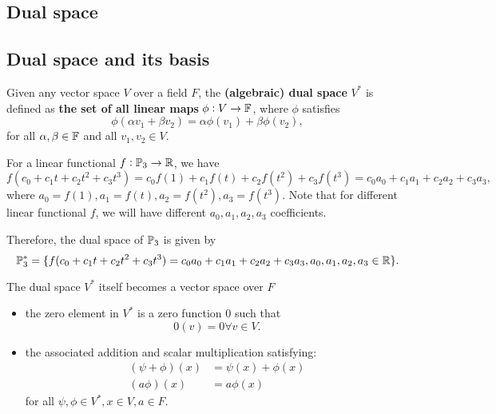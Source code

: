 \begin{refsection}
\section{Dual space}
\subsection{Dual space and its basis}
\begin{definition}
Given any vector space $V$ over a field $F$, the \textbf{(algebraic) dual space} $V^*$ is defined as \textbf{the set of all linear maps} $\phi: V \to  \mathbb{F}$, where $\phi$ satisfies
$$\phi(\alpha v_1+\beta v_2) = \alpha \phi(v_1) + \beta \phi(v_2),$$ 
for all $\alpha,\beta\in \mathbb{F}$ and all $v_1,v_2\in V$.
\end{definition}

\begin{example}For a linear functional $f:\mathbb{P}_3\to \mathbb{R}$, we have
	$$f(c_0+c_1t+c_2t^2+c_3t^3) = c_0f(1)+c_1f(t)+c_2f(t^2)+c_3f(t^3) = c_0a_0+c_1a_1+c_2a_2+c_3a_3,$$
	where $a_0 = f(1), a_1=f(t),a_2=f(t^2), a_3=f(t^3).$ Note that for different linear functional $f$, we will have different $a_0,a_1,a_2,a_3$ coefficients.
	
	Therefore, the dual space of $\mathbb{P}_3$ is given by
	$$\mathbb{P}_3^* = \{f(c_0+c_1t+c_2t^2+c_3t^3)=c_0a_0+c_1a_1+c_2a_2+c_3a_3,a_0,a_1,a_2,a_3\in \mathbb{R}\}.$$
\end{example}


\begin{lemma}
The dual space $V^*$ itself becomes a vector space over $F$ 
\begin{itemize}
	\item the zero element in $V^*$ is a zero function 0 such that
	$$0(v) = 0 \forall v\in V.$$
	\item the associated addition and scalar multiplication 
	satisfying:
	\begin{align*}
	(\psi + \phi)(x) &= \psi(x) + \phi(x)\\
	(a\phi)(x) &= a\phi(x)
	\end{align*}
	for all $\psi,\phi \in V^*, x\in V, a\in F.$ 
\end{itemize}	
\end{lemma}



\end{refsection}
